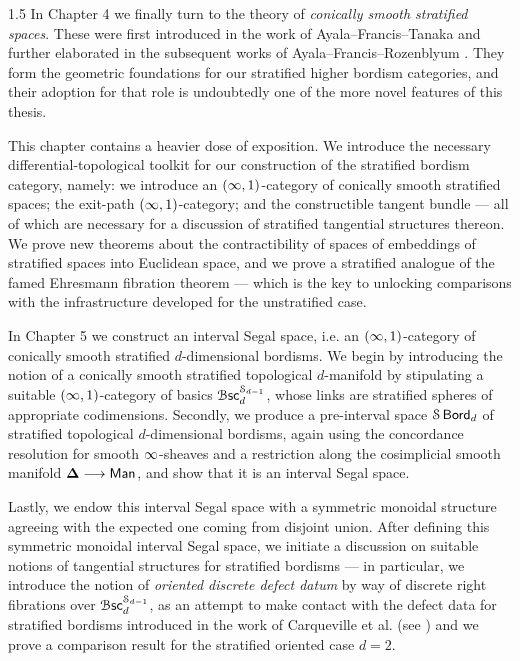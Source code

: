 \documentclass{amsbook}
\begin{document}
\begin{spacing}{1.5}
In Chapter 4 we finally turn to the theory of \emph{conically smooth stratified spaces}. These were first introduced in the work of Ayala--Francis--Tanaka and further elaborated in the subsequent works of Ayala--Francis--Rozenblyum \cite{AFT1, AFR1, AFR2}. They form the geometric foundations for our stratified higher bordism categories, and their adoption for that role is undoubtedly one of the more novel features of this thesis.

This chapter contains a heavier dose of exposition. We introduce the necessary differential-topological toolkit for our construction of the stratified bordism category, namely: we introduce an $(\operatorname{\infty},1)$-category of conically smooth stratified spaces; the exit-path $(\operatorname{\infty},1)$-category; and the constructible tangent bundle — all of which are necessary for a discussion of stratified tangential structures thereon. We prove new theorems about the contractibility of spaces of embeddings of stratified spaces into Euclidean space, and we prove a stratified analogue of the famed Ehresmann fibration theorem — which is the key to unlocking comparisons with the infrastructure developed for the unstratified case.

In Chapter 5 we construct an interval Segal space, i.e. an $(\operatorname{\infty},1)$-category of conically smooth stratified $d$-dimensional bordisms. We begin by introducing the notion of a conically smooth stratified topological $d$-manifold by stipulating a suitable $(\operatorname{\infty},1)$-category of basics $\operatorname{\mathcal B\mathsf{sc}}_{d}^{\mathcal S_{d-1}}$, whose links are stratified spheres of appropriate codimensions. Secondly, we produce a pre-interval space $\mathcal S \operatorname{\mathsf{Bord}}_d$ of stratified topological $d$-dimensional bordisms, again using the concordance resolution for smooth $\operatorname{\infty}$-sheaves and a restriction along the cosimplicial smooth manifold $\mathbf\Delta \longrightarrow \operatorname{\sf Man}$, and show that it is an interval Segal space.

Lastly, we endow this interval Segal space with a symmetric monoidal structure agreeing with the expected one coming from disjoint union. After defining this symmetric monoidal interval Segal space, we initiate a discussion on suitable notions of tangential structures for stratified bordisms — in particular, we introduce the notion of \emph{oriented discrete defect datum} by way of discrete right fibrations over $\operatorname{\mathcal B\mathsf{sc}}_{d}^{\mathcal S_{d-1}}$, as an attempt to make contact with the defect data for stratified bordisms introduced in the work of Carqueville et al. (see \cite{CRS19}) and we prove a comparison result for the stratified oriented case $d=2$.


\end{spacing}
\end{document}
